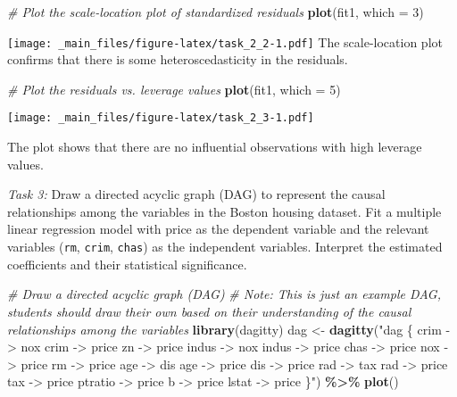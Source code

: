\documentclass[
]{book}
\newenvironment{Shaded}{\begin{snugshade}}{\end{snugshade}}
\newcommand{\AttributeTok}[1]{\textcolor[rgb]{0.13,0.29,0.53}{#1}}
\newcommand{\CommentTok}[1]{\textcolor[rgb]{0.56,0.35,0.01}{\textit{#1}}}
\newcommand{\DecValTok}[1]{\textcolor[rgb]{0.00,0.00,0.81}{#1}}
\newcommand{\FunctionTok}[1]{\textcolor[rgb]{0.13,0.29,0.53}{\textbf{#1}}}
\newcommand{\NormalTok}[1]{#1}
\newcommand{\OtherTok}[1]{\textcolor[rgb]{0.56,0.35,0.01}{#1}}
\newcommand{\SpecialCharTok}[1]{\textcolor[rgb]{0.81,0.36,0.00}{\textbf{#1}}}
\newcommand{\StringTok}[1]{\textcolor[rgb]{0.31,0.60,0.02}{#1}}
\begin{document}
\begin{Shaded}
\begin{Highlighting}[]
\CommentTok{\# Plot the scale{-}location plot of standardized residuals}
\FunctionTok{plot}\NormalTok{(fit1, }\AttributeTok{which =} \DecValTok{3}\NormalTok{)}
\end{Highlighting}
\end{Shaded}

\texttt{[image: \_main\_files/figure-latex/task\_2\_2-1.pdf]}
The scale-location plot confirms that there is some heteroscedasticity in the residuals.

\begin{Shaded}
\begin{Highlighting}[]
\CommentTok{\# Plot the residuals vs. leverage values}
\FunctionTok{plot}\NormalTok{(fit1, }\AttributeTok{which =} \DecValTok{5}\NormalTok{)}
\end{Highlighting}
\end{Shaded}

\texttt{[image: \_main\_files/figure-latex/task\_2\_3-1.pdf]}

The plot shows that there are no influential observations with high leverage values.

\emph{Task 3:} Draw a directed acyclic graph (DAG) to represent the causal relationships among the variables in the Boston housing dataset. Fit a multiple linear regression model with price as the dependent variable and the relevant variables (\texttt{rm}, \texttt{crim}, \texttt{chas}) as the independent variables. Interpret the estimated coefficients and their statistical significance.

\begin{Shaded}
\begin{Highlighting}[]
\CommentTok{\# Draw a directed acyclic graph (DAG)}
\CommentTok{\# Note: This is just an example DAG, students should draw their own based on their understanding of the causal relationships among the variables}
\FunctionTok{library}\NormalTok{(dagitty)}
\NormalTok{dag }\OtherTok{\textless{}{-}} \FunctionTok{dagitty}\NormalTok{(}\StringTok{"dag \{}
\StringTok{  crim {-}\textgreater{} nox}
\StringTok{  crim {-}\textgreater{} price}
\StringTok{  zn {-}\textgreater{} price}
\StringTok{  indus {-}\textgreater{} nox}
\StringTok{  indus {-}\textgreater{} price}
\StringTok{  chas {-}\textgreater{} price}
\StringTok{  nox {-}\textgreater{} price}
\StringTok{  rm {-}\textgreater{} price}
\StringTok{  age {-}\textgreater{} dis}
\StringTok{  age {-}\textgreater{} price}
\StringTok{  dis {-}\textgreater{} price}
\StringTok{  rad {-}\textgreater{} tax}
\StringTok{  rad {-}\textgreater{} price}
\StringTok{  tax {-}\textgreater{} price}
\StringTok{  ptratio {-}\textgreater{} price}
\StringTok{  b {-}\textgreater{} price}
\StringTok{  lstat {-}\textgreater{} price}
\StringTok{\}"}\NormalTok{) }\SpecialCharTok{\%\textgreater{}\%} 
  \FunctionTok{plot}\NormalTok{()}
\end{Highlighting}
\end{Shaded}
\end{document}
